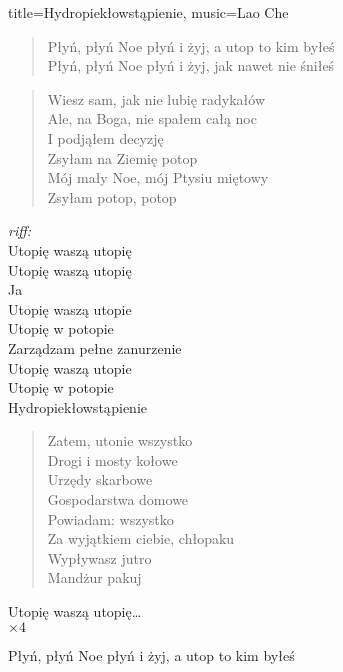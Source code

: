 \begin{song}{title={Hydropiekłowstąpienie}, music={Lao Che}}
\begin{multicols}{2}
\begin{verse}
        Płyń, płyń Noe płyń i żyj, a utop to kim byłeś \\
        Płyń, płyń Noe płyń i żyj, jak nawet nie śniłeś
    \end{verse}
    \begin{verse}
        Wiesz sam, jak nie lubię radykałów \\
        Ale, na Boga, nie spałem całą noc \\
        I podjąłem decyzję \\
        Zsyłam na Ziemię potop \\
        Mój mały Noe, mój Ptysiu miętowy \\
        Zsyłam potop, potop
    \end{verse}
    \begin{chorus}
        \textit{riff: }    \\
        Utopię waszą utopię \\
        Utopię waszą utopię \\
        Ja \\
        Utopię waszą utopie \\
        Utopię w potopie \\
        Zarządzam pełne zanurzenie \\
        Utopię waszą utopie \\
        Utopię w potopie \\
        Hydropiekłowstąpienie 
    \end{chorus}
    \begin{verse}
        Zatem, utonie wszystko \\
        Drogi i mosty kołowe \\
        Urzędy skarbowe \\
        Gospodarstwa domowe \\
        Powiadam: wszystko \\
        Za wyjątkiem ciebie, chłopaku \\
        Wypływasz jutro \\
        Mandżur pakuj
    \end{verse}
    \begin{chorus}
        Utopię waszą utopię\ldots \\
            $\times 4$
    \end{chorus}
    \begin{interlude}
        Płyń, płyń Noe płyń i żyj, a utop to kim byłeś \\

\end{interlude}
\end{multicols}
\end{song}
